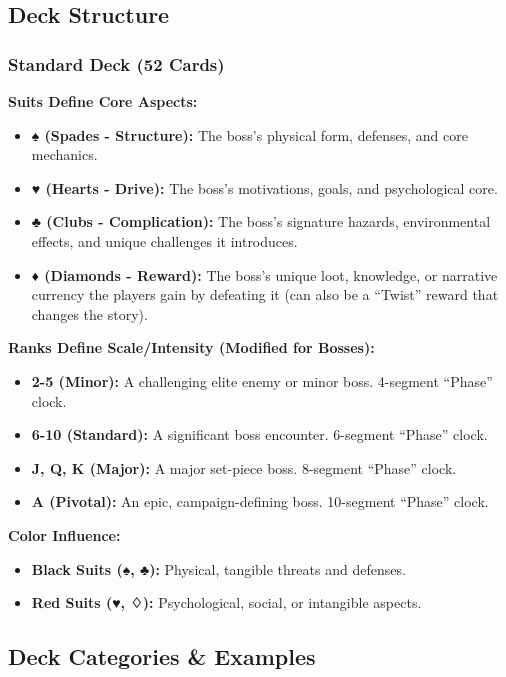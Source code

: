 \subsection{Deck Structure}

\subsubsection{Standard Deck (52 Cards)}

\textbf{Suits Define Core Aspects:}
\begin{itemize}
    \item \textbf{♠ (Spades - Structure):} The boss's physical form, defenses, and core mechanics.
    \item \textbf{♥ (Hearts - Drive):} The boss's motivations, goals, and psychological core.
    \item \textbf{♣ (Clubs - Complication):} The boss's signature hazards, environmental effects, and unique challenges it introduces.
    \item \textbf{♦ (Diamonds - Reward):} The boss's unique loot, knowledge, or narrative currency the players gain by defeating it (can also be a ``Twist'' reward that changes the story).
\end{itemize}

\textbf{Ranks Define Scale/Intensity (Modified for Bosses):}
\begin{itemize}
    \item \textbf{2-5 (Minor):} A challenging elite enemy or minor boss. 4-segment ``Phase'' clock.
    \item \textbf{6-10 (Standard):} A significant boss encounter. 6-segment ``Phase'' clock.
    \item \textbf{J, Q, K (Major):} A major set-piece boss. 8-segment ``Phase'' clock.
    \item \textbf{A (Pivotal):} An epic, campaign-defining boss. 10-segment ``Phase'' clock.
\end{itemize}

\textbf{Color Influence:}
\begin{itemize}
    \item \textbf{Black Suits (♠, ♣):} Physical, tangible threats and defenses.
    \item \textbf{Red Suits (♥, ♢):} Psychological, social, or intangible aspects.
\end{itemize}

\subsection{Deck Categories \& Examples}

